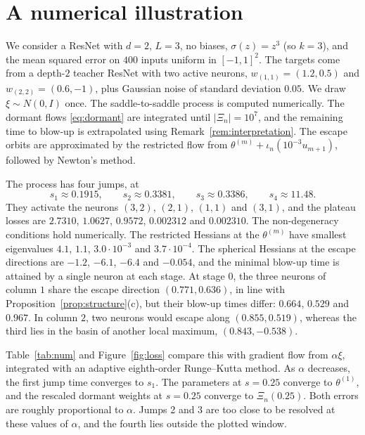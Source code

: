 \documentclass[11pt]{article}
\theoremstyle{definition}
\theoremstyle{remark}
\numberwithin{equation}{section}
\begin{document}
\section{A numerical illustration}\label{sec:numerics}

We consider a ResNet with $d=2$, $L=3$, no biases, $\sigma(z)=z^3$ (so $k=3$), and the mean squared error on $400$ inputs uniform in $[-1,1]^2$. The targets come from a depth-$2$ teacher ResNet with two active neurons, $w_{(1,1)}=(1.2,0.5)$ and $w_{(2,2)}=(0.6,-1)$, plus Gaussian noise of standard deviation $0.05$. We draw $\xi\sim N(0,I)$ once. The saddle-to-saddle process is computed numerically. The dormant flows \eqref{eq:dormant} are integrated until $|\Xi_n|=10^7$, and the remaining time to blow-up is extrapolated using Remark~\ref{rem:interpretation}. The escape orbits are approximated by the restricted flow from $\theta^{(m)}+\iota_n(10^{-3}u_{m+1})$, followed by Newton's method.

The process has four jumps, at
\[
s_1\approx0.1915,\qquad s_2\approx0.3381,\qquad s_3\approx0.3386,\qquad s_4\approx11.48 .
\]
They activate the neurons $(3,2)$, $(2,1)$, $(1,1)$ and $(3,1)$, and the plateau losses are $2.7310$, $1.0627$, $0.9572$, $0.002312$ and $0.002310$. The non-degeneracy conditions hold numerically. The restricted Hessians at the $\theta^{(m)}$ have smallest eigenvalues $4.1$, $1.1$, $3.0\cdot10^{-3}$ and $3.7\cdot10^{-4}$. The spherical Hessians at the escape directions are $-1.2$, $-6.1$, $-6.4$ and $-0.054$, and the minimal blow-up time is attained by a single neuron at each stage. At stage $0$, the three neurons of column $1$ share the escape direction $(0.771,0.636)$, in line with Proposition~\ref{prop:structure}(c), but their blow-up times differ: $0.664$, $0.529$ and $0.967$. In column $2$, two neurons would escape along $(0.855,0.519)$, whereas the third lies in the basin of another local maximum, $(0.843,-0.538)$.

Table~\ref{tab:num} and Figure~\ref{fig:loss} compare this with gradient flow from $\alpha\xi$, integrated with an adaptive eighth-order Runge--Kutta method. As $\alpha$ decreases, the first jump time converges to $s_1$. The parameters at $s=0.25$ converge to $\theta^{(1)}$, and the rescaled dormant weights at $s=0.25$ converge to $\Xi_n(0.25)$. Both errors are roughly proportional to $\alpha$. Jumps 2 and 3 are too close to be resolved at these values of $\alpha$, and the fourth lies outside the plotted window.
\end{document}
